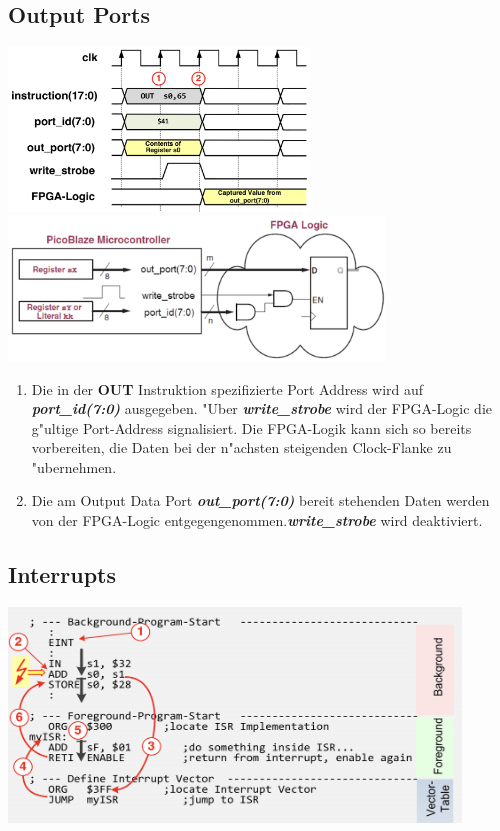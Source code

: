 \subsection{Output Ports}
\includegraphics[width=8cm]{pics/7-Output-Ports_Timing}
\includegraphics[width=10cm]{pics/7-Output-Ports_Logik}
\begin{enumerate}
	\color{red}
	\renewcommand{\labelenumi}{\circled{\oldlabelenumi}}
		\item \color{black} Die in der \color{red} \textbf{OUT} \color{black} Instruktion spezifizierte Port Address wird auf \textit{\textbf{port\_id(7:0)}} ausgegeben. "Uber \textit{\textbf{write\_strobe}} wird der FPGA-Logic die g"ultige Port-Address signalisiert. Die FPGA-Logik kann sich so bereits vorbereiten, die Daten bei der n"achsten steigenden Clock-Flanke zu "ubernehmen.
	\renewcommand{\labelenumi}{\oldlabelenumi}
	\color{red}
	\renewcommand{\labelenumi}{\circled{\oldlabelenumi}}
		\item \color{black} Die am Output Data Port \textit{\textbf{out\_port(7:0)}} bereit stehenden Daten werden von der FPGA-Logic entgegengenommen.\textit{\textbf{write\_strobe}} wird deaktiviert.
	\renewcommand{\labelenumi}{\oldlabelenumi}
\end{enumerate}

\subsection{Interrupts}
\includegraphics[width=12cm]{pics/7-Interrupts_Code}

